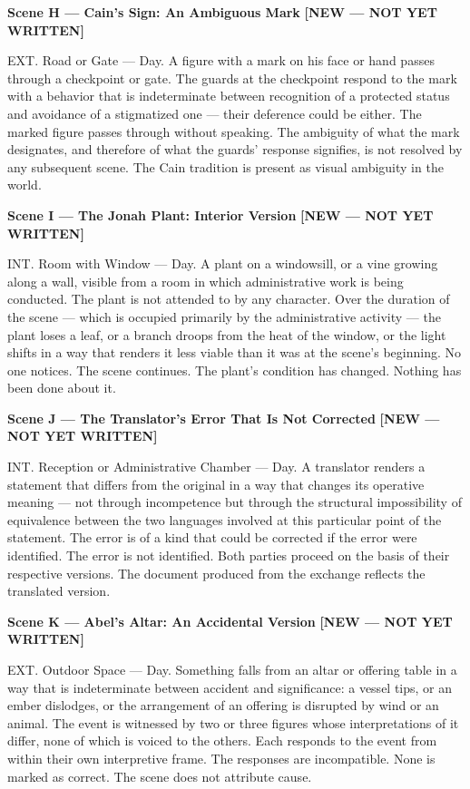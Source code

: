 \documentclass[12pt, oneside]{amsart}
\newcommand{\statusnew}{{\small\bfseries\color{newscene}[NEW --- NOT YET WRITTEN]}}
\begin{document}
\bigskip

\noindent\textbf{Scene H --- Cain's Sign: An Ambiguous Mark} \statusnew

\noindent EXT. Road or Gate --- Day. A figure with a mark on his face or hand passes through a checkpoint or gate. The guards at the checkpoint respond to the mark with a behavior that is indeterminate between recognition of a protected status and avoidance of a stigmatized one --- their deference could be either. The marked figure passes through without speaking. The ambiguity of what the mark designates, and therefore of what the guards' response signifies, is not resolved by any subsequent scene. The Cain tradition is present as visual ambiguity in the world.

\bigskip

\noindent\textbf{Scene I --- The Jonah Plant: Interior Version} \statusnew

\noindent INT. Room with Window --- Day. A plant on a windowsill, or a vine growing along a wall, visible from a room in which administrative work is being conducted. The plant is not attended to by any character. Over the duration of the scene --- which is occupied primarily by the administrative activity --- the plant loses a leaf, or a branch droops from the heat of the window, or the light shifts in a way that renders it less viable than it was at the scene's beginning. No one notices. The scene continues. The plant's condition has changed. Nothing has been done about it.

\bigskip

\noindent\textbf{Scene J --- The Translator's Error That Is Not Corrected} \statusnew

\noindent INT. Reception or Administrative Chamber --- Day. A translator renders a statement that differs from the original in a way that changes its operative meaning --- not through incompetence but through the structural impossibility of equivalence between the two languages involved at this particular point of the statement. The error is of a kind that could be corrected if the error were identified. The error is not identified. Both parties proceed on the basis of their respective versions. The document produced from the exchange reflects the translated version.

\bigskip

\noindent\textbf{Scene K --- Abel's Altar: An Accidental Version} \statusnew

\noindent EXT. Outdoor Space --- Day. Something falls from an altar or offering table in a way that is indeterminate between accident and significance: a vessel tips, or an ember dislodges, or the arrangement of an offering is disrupted by wind or an animal. The event is witnessed by two or three figures whose interpretations of it differ, none of which is voiced to the others. Each responds to the event from within their own interpretive frame. The responses are incompatible. None is marked as correct. The scene does not attribute cause.
\end{document}
